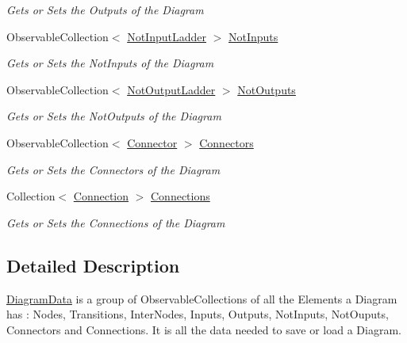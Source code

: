 \begin{DoxyCompactItemize}
\begin{DoxyCompactList}\small\item\em Gets or Sets the Outputs of the Diagram \end{DoxyCompactList}\item 
Observable\+Collection$<$ \hyperlink{class_prototipo_t_f_g_1_1_not_input_ladder}{Not\+Input\+Ladder} $>$ \hyperlink{class_prototipo_t_f_g_1_1_diagram_data_a2822d1875199aa27bddc54e4ed7929d3}{Not\+Inputs}
\begin{DoxyCompactList}\small\item\em Gets or Sets the Not\+Inputs of the Diagram \end{DoxyCompactList}\item 
Observable\+Collection$<$ \hyperlink{class_prototipo_t_f_g_1_1_not_output_ladder}{Not\+Output\+Ladder} $>$ \hyperlink{class_prototipo_t_f_g_1_1_diagram_data_af65586187f9255073987a87b8f15a6db}{Not\+Outputs}
\begin{DoxyCompactList}\small\item\em Gets or Sets the Not\+Outputs of the Diagram \end{DoxyCompactList}\item 
Observable\+Collection$<$ \hyperlink{class_prototipo_t_f_g_1_1_connector}{Connector} $>$ \hyperlink{class_prototipo_t_f_g_1_1_diagram_data_a6928a8a58cf692d8ab07efb182fb6796}{Connectors}
\begin{DoxyCompactList}\small\item\em Gets or Sets the Connectors of the Diagram \end{DoxyCompactList}\item 
Collection$<$ \hyperlink{class_prototipo_t_f_g_1_1_connection}{Connection} $>$ \hyperlink{class_prototipo_t_f_g_1_1_diagram_data_ac3dc6609bac7480c21e65080e83d5238}{Connections}
\begin{DoxyCompactList}\small\item\em Gets or Sets the Connections of the Diagram \end{DoxyCompactList}\end{DoxyCompactItemize}


\subsection{Detailed Description}
\hyperlink{class_prototipo_t_f_g_1_1_diagram_data}{Diagram\+Data} is a group of Observable\+Collections of all the Elements a Diagram has \+: Nodes, Transitions, Inter\+Nodes, Inputs, Outputs, Not\+Inputs, Not\+Ouputs, Connectors and Connections. It is all the data needed to save or load a Diagram. 



